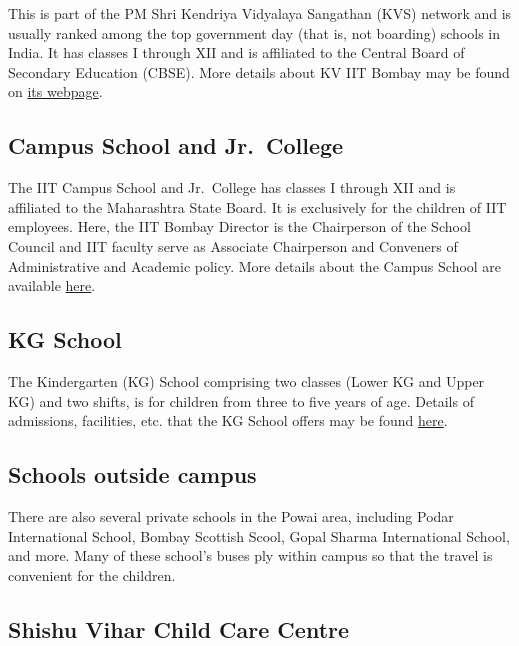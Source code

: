 \documentclass[
  10pt,
  a5paper,
  10pt,
  openany]{amsbook}
\begin{document}
This is part of the PM Shri Kendriya Vidyalaya Sangathan (KVS) network
and is usually ranked among the top government day (that is, not
boarding) schools in India. It has classes I through XII and is
affiliated to the Central Board of Secondary Education (CBSE). More
details about KV IIT Bombay may be found on
\href{https://iitpowai.kvs.ac.in/}{its webpage}.

\subsection*{Campus School and
Jr.~College}\label{campus-school-and-jr.-college}

The IIT Campus School and Jr.~College has classes I through XII and is
affiliated to the Maharashtra State Board. It is exclusively for the
children of IIT employees. Here, the IIT Bombay Director is the
Chairperson of the School Council and IIT faculty serve as Associate
Chairperson and Conveners of Administrative and Academic policy. More
details about the Campus School are available
\href{https://www.iitbcampusschool.ac.in/}{here}.

\subsection*{KG School}\label{kg-school}

The Kindergarten (KG) School comprising two classes (Lower KG and Upper
KG) and two shifts, is for children from three to five years of age.
Details of admissions, facilities, etc. that the KG School offers may be
found \href{http://home.iitb.ac.in/~kgschool/index.html}{here}.

\subsection*{Schools outside campus}\label{schools-outside-campus}

There are also several private schools in the Powai area, including
Podar International School, Bombay Scottish Scool, Gopal Sharma
International School, and more. Many of these school's buses ply within
campus so that the travel is convenient for the children.

\subsection*{Shishu Vihar Child Care
Centre}\label{shishu-vihar-child-care-centre}
\end{document}
